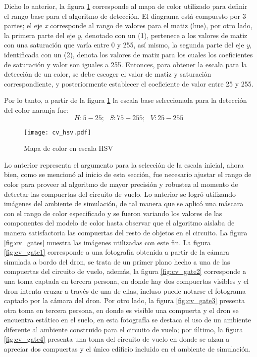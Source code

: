 Dicho lo anterior, la figura \ref{fig:cv_hsv} corresponde al mapa de color utilizado para definir el rango base para el algoritmo de detección. El diagrama está compuesto por 3 partes; el eje \textit{x} corresponde al rango de valores para el matiz (hue), por otro lado, la primera parte del eje \textit{y}, denotado con un (1), pertenece a los valores de matiz con una saturación que varía entre 0 y 255, así mismo, la segunda parte del eje \textit{y}, identificada con un (2), denota los valores de matiz para los cuales los coeficientes de saturación y valor son iguales a 255. Entonces, para obtener la escala para la detección de un color, se debe escoger el valor de matiz y saturación correspondiente, y posteriormente establecer el coeficiente de valor entre 25 y 255.

Por lo tanto, a partir de la figura \ref{fig:cv_hsv} la escala base seleccionada para la detección del color naranja fue: \[H:5-25;\text{ } S:75-255;\text{ } V:25-255\]

\begin{figure}[ht]
    \centering
    \texttt{[image: cv\_hsv.pdf]}
    \caption{Mapa de color en escala HSV}
    \label{fig:cv_hsv}
\end{figure}

Lo anterior representa el argumento para la selección de la escala inicial, ahora bien, como se mencionó al inicio de esta sección, fue necesario ajustar el rango de color para proveer al algoritmo de mayor precisión y robustez al momento de detectar las compuertas del circuito de vuelo. Lo anterior se logró utilizando imágenes del ambiente de simulación, de tal manera que se aplicó una máscara con el rango de color especificado y se fueron variando los valores de las componentes del modelo de color hasta observar que el algoritmo aislaba de manera satisfactoria las compuertas del resto de objetos en el circuito. La figura \ref{fig:cv_gates} muestra las imágenes utilizadas con este fin. La figura \ref{fig:cv_gate1} corresponde a una fotografía obtenida a partir de la cámara simulada a bordo del dron, se trata de un primer plano hecho a una de las compuertas del circuito de vuelo, además, la figura \ref{fig:cv_gate2} corresponde a una toma captada en tercera persona, en donde hay dos compuertas visibles y el dron intenta cruzar a través de una de ellas, incluso puede notarse el fotograma captado por la cámara del dron. Por otro lado, la figura \ref{fig:cv_gate3} presenta otra toma en tercera persona, en donde es visible una compuerta y el dron se encuentra estático en el suelo, en esta fotografía se destaca el uso de un ambiente diferente al ambiente construido para el circuito de vuelo; por último, la figura \ref{fig:cv_gate4} presenta una toma del circuito de vuelo en donde se alzan a apreciar dos compuertas y el único edificio incluido en el ambiente de simulación. 

